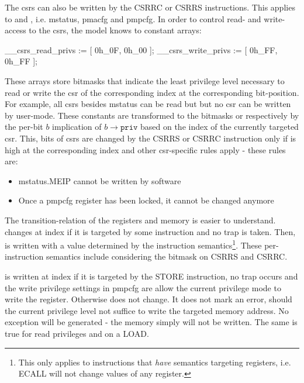 The \glspl{csr} can also be written by the CSRRC or CSRRS instructions.
This applies to  and , i.e. \gls{mstatus}, \gls{pmacfg} and \gls{pmpcfg}.
In order to control read- and write-access to the \glspl{csr}, the model knows to constant arrays:
\begin{smv}
__csrs_read_privs := [ 0h_0F, 0h_00 ];
__csrs_write_privs := [ 0h_FF, 0h_FF ];
\end{smv}

These arrays store bitmasks that indicate the least privilege level necessary to read or write the \gls{csr} of the corresponding index at the corresponding bit-position.
For example, all \glspl{csr} besides \gls{mstatus} can be read but but no \gls{csr} can be written by user-mode.
These constants are transformed to the bitmasks  or  respectively by the per-bit $ b $ implication of $ b \rightarrow \texttt{priv} $ based on the index of the currently targeted \gls{csr}.
This, bits of \glspl{csr} are changed by the CSRRS or CSRRC instruction only if  is high at the corresponding index and other \gls{csr}-specific rules apply - these rules are:
\begin{itemize}
    \item \gls{mstatus}.MEIP cannot be written by software
    \item Once a \gls{pmpcfg} register has been locked, it cannot be changed anymore
\end{itemize}

The transition-relation of the registers and memory is easier to understand.
 changes at index  if it is targeted by some instruction and no trap is taken.
Then,  is written with a value determined by the instruction semantics\footnote{%
    This only applies to instructions that \textit{have} semantics targeting registers, i.e. ECALL will not change values of any register.
}.
These per-instruction semantics include considering the  bitmask on CSRRS and CSRRC.

 is written at index  if it is targeted by the STORE instruction, no trap occurs and the write privilege settings in \gls{pmpcfg} are allow the current privilege mode to write the register.
Otherwise  does not change.
It does not mark an error, should the current privilege level not suffice to write the targeted memory address.
No exception will be generated - the memory simply will not be written.
The same is true for read privileges and  on a LOAD.

